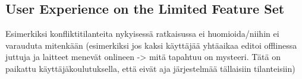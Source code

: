 \subsection{User Experience on the Limited Feature Set}
Esimerkiksi konfliktitilanteita nykyisessä ratkaisussa ei huomioida/niihin ei varauduta mitenkään (esimerkiksi jos kaksi käyttäjää yhtäaikaa editoi offlinessa juttuja ja laitteet menevät onlineen -> mitä tapahtuu on mysteeri. Tätä on paikattu käyttäjäkoulutuksella, että eivät aja järjestelmää tällaisiin tilanteisiin) 

